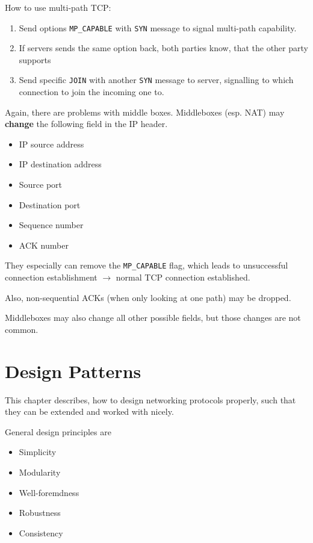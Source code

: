 \documentclass[english]{panikzettel}
\begin{document}
	How to use multi-path TCP:
	\begin{enumerate}
		\item Send options \texttt{MP\_CAPABLE} with \texttt{SYN} message to signal multi-path capability.
		\item If servers sends the same option back, both parties know, that the other party supports 
		\item Send specific \texttt{JOIN} with another \texttt{SYN} message to server, signalling to which connection to join the incoming one to.
	\end{enumerate}

	Again, there are problems with middle boxes.
	Middleboxes (esp. NAT) may \textbf{change} the following field in the IP header.
	\begin{itemize}
		\item IP source address
		\item IP destination address
		\item Source port
		\item Destination port
		\item Sequence number 
		\item ACK number
	\end{itemize}
	They especially can remove the \texttt{MP\_CAPABLE} flag, which leads to unsuccessful connection establishment \( \rightarrow \) normal TCP connection established.

	Also, non-sequential ACKs (when only looking at one path) may be dropped.
	
	Middleboxes may also change all other possible fields, but those changes are not common.
		
	\section{Design Patterns}
	\label{design-patterns}
	
	This chapter describes, how to design networking protocols properly, such that they can be extended and worked with nicely. 

	General design principles are
	\begin{itemize}
		\item Simplicity
		\item Modularity
		\item Well-foremdness
		\item Robustness
		\item Consistency
	\end{itemize}
\end{document}
